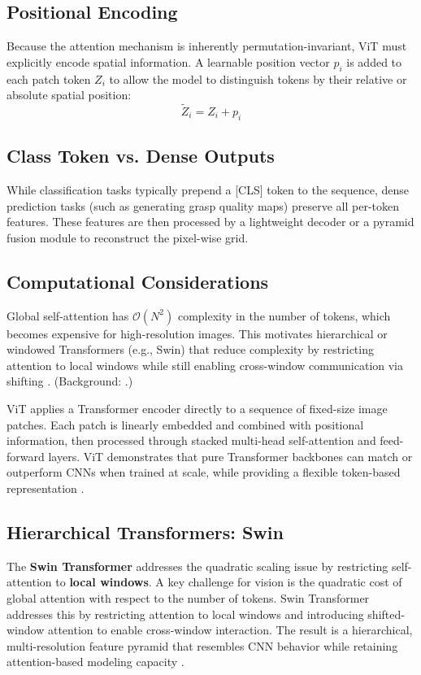 \subsection{Positional Encoding}
Because the attention mechanism is inherently permutation-invariant, ViT must explicitly encode spatial information. A learnable position vector $p_i$ is added to each patch token $Z_i$ to allow the model to distinguish tokens by their relative or absolute spatial position:
\begin{equation}
    \tilde{Z}_i = Z_i + p_i
\end{equation}

\subsection{Class Token vs. Dense Outputs}
While classification tasks typically prepend a [CLS] token to the sequence, dense prediction tasks (such as generating grasp quality maps) preserve all per-token features. These features are then processed by a lightweight decoder or a pyramid fusion module to reconstruct the pixel-wise grid.

\subsection{Computational Considerations}
Global self-attention has $\mathcal{O}(N^2)$ complexity in the number of tokens, which becomes expensive for high-resolution images. This motivates hierarchical or windowed Transformers (e.g., Swin) that reduce complexity by restricting attention to local windows while still enabling cross-window communication via shifting \cite{liu2021swin}. (Background: \cite{dosovitskiy2021vit, vaswani2017attention}.)

ViT applies a Transformer encoder directly to a sequence of fixed-size image patches. Each patch is linearly embedded and combined with positional information, then processed through stacked multi-head self-attention and feed-forward layers. ViT demonstrates that pure Transformer backbones can match or outperform CNNs when trained at scale, while providing a flexible token-based representation \cite{dosovitskiy2021vit}.
\clearpage

\subsection{Hierarchical Transformers: Swin}
The \textbf{Swin Transformer} addresses the quadratic scaling issue by restricting self-attention to \textbf{local windows}. A key challenge for vision is the quadratic cost of global attention with respect to the number of tokens. Swin Transformer addresses this by restricting attention to local windows and introducing shifted-window attention to enable cross-window interaction. The result is a hierarchical, multi-resolution feature pyramid that resembles CNN behavior while retaining attention-based modeling capacity \cite{liu2021swin}.

